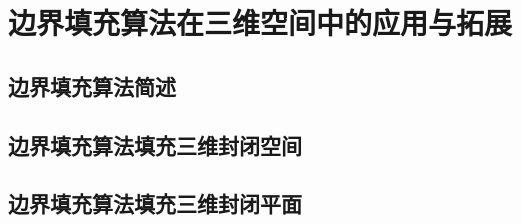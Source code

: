 \section{边界填充算法在三维空间中的应用与拓展}
\subsection{边界填充算法简述}
\subsection{边界填充算法填充三维封闭空间}
\subsection{边界填充算法填充三维封闭平面}